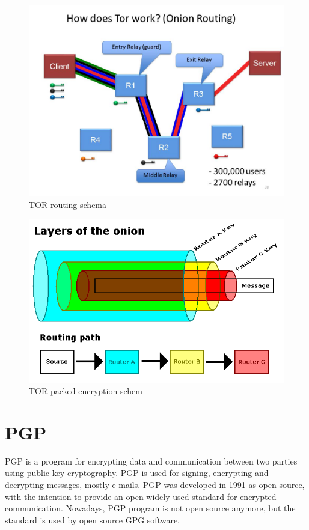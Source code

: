 \documentclass[
  digital, %
  table,   %
  lof,     %
  lot,     %
  oneside
]{fithesis3}
\begin{document}
 \begin{figure}[!htb]
    \centering
    \includegraphics[width=1\textwidth]{tor-prejate}
    \caption{TOR routing schema}
    \label{TOR routing schema}
\end{figure}
 
  \begin{figure}[!htb]
    \centering
    \includegraphics[width=1\textwidth]{tor-packet-prejate}
    \caption{TOR packed encryption schem}
    \label{TOR packed encryption schema}
\end{figure}
 
\section{PGP}

PGP \parencite{Zimmermann:1995:OPU:202735} is a program for encrypting data
and communication between two parties using public key cryptography.
PGP is used for signing, encrypting and decrypting messages, mostly e-mails.
PGP was developed in 1991 as open source, with the intention 
to provide an open widely used standard for encrypted communication.
Nowadays, PGP program is not open source anymore, but the standard is used by open source GPG software.
\end{document}
